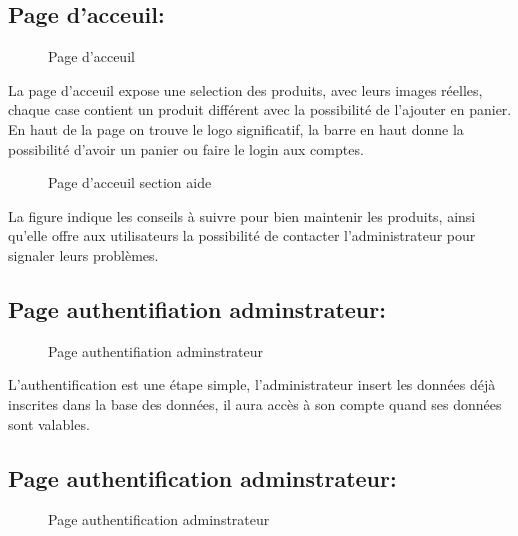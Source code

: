 \documentclass[a4paper]{report}
\begin{document}
\begin{doublespace}
    \subsection{Page d'acceuil:}
    \begin{figure}[H]
        \begin{center}
            \caption{Page d'acceuil}
        \end{center}
    \end{figure}
    \newpage
    La page d'acceuil expose une selection des produits,
    avec leurs images réelles, chaque case contient un produit différent avec la
    possibilité de l'ajouter en panier. En haut de la page on trouve le logo
    significatif, la barre en haut donne la possibilité d'avoir un panier ou faire
    le login aux comptes.
    \begin{figure}[H]
        \begin{center}
            \caption{Page d'acceuil section aide }
        \end{center}
    \end{figure}
    La figure indique les conseils à suivre pour bien
    maintenir les produits, ainsi qu'elle offre aux utilisateurs la possibilité de
    contacter l'administrateur pour signaler leurs problèmes.
    \subsection{Page authentifiation adminstrateur:}
    \begin{figure}[H]
        \begin{center}
            \caption{Page authentifiation adminstrateur}
        \end{center}
    \end{figure}
    L’authentification est une étape simple,
    l'administrateur insert les données déjà inscrites dans la base des données, il
    aura accès à son compte quand ses données sont valables.
    \subsection{Page authentification adminstrateur:}
    \begin{figure}[H]
        \begin{center}
            \caption{Page authentification adminstrateur}
        \end{center}
    \end{figure}

\end{doublespace}
\end{document}
